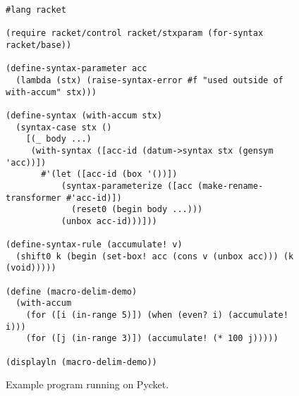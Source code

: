 \begin{figure}[!h]
\centering

\begin{minipage}{0.9\textwidth}
\begin{lstlisting}[language=racket,
                basicstyle=\ttfamily\footnotesize,
                numbers=none, xleftmargin=2em]
#lang racket

(require racket/control racket/stxparam (for-syntax racket/base))

(define-syntax-parameter acc
  (lambda (stx) (raise-syntax-error #f "used outside of with-accum" stx)))

(define-syntax (with-accum stx)
  (syntax-case stx ()
    [(_ body ...)
     (with-syntax ([acc-id (datum->syntax stx (gensym 'acc))])
       #'(let ([acc-id (box '())])
           (syntax-parameterize ([acc (make-rename-transformer #'acc-id)])
             (reset0 (begin body ...)))
           (unbox acc-id)))]))

(define-syntax-rule (accumulate! v)
  (shift0 k (begin (set-box! acc (cons v (unbox acc))) (k (void)))))

(define (macro-delim-demo)
  (with-accum
    (for ([i (in-range 5)]) (when (even? i) (accumulate! i)))
    (for ([j (in-range 3)]) (accumulate! (* 100 j)))))

(displayln (macro-delim-demo))
\end{lstlisting}
\caption{Example  program running on Pycket.}
\label{fig:pycket-works-big-example}
\end{minipage}
\end{figure}
